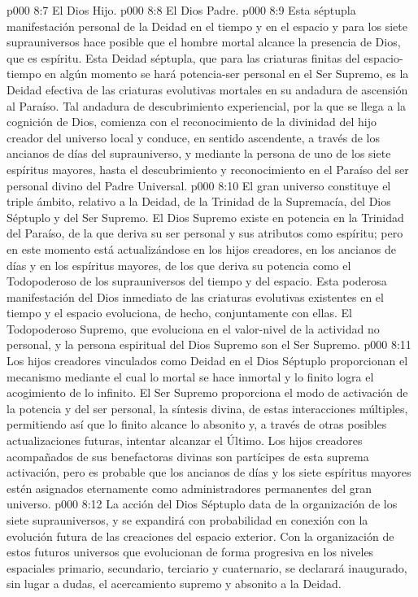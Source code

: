 \vs p000 8:7 El Dios Hijo.
\vs p000 8:8 El Dios Padre.
\vs p000 8:9 \pc Esta séptupla manifestación personal de la Deidad en el tiempo y en el espacio y para los siete suprauniversos hace posible que el hombre mortal alcance la presencia de Dios, que es espíritu. Esta Deidad séptupla, que para las criaturas finitas del espacio\hyp{}tiempo en algún momento se hará potencia\hyp{}ser personal en el Ser Supremo, es la Deidad efectiva de las criaturas evolutivas mortales en su andadura de ascensión al Paraíso. Tal andadura de descubrimiento experiencial, por la que se llega a la cognición de Dios, comienza con el reconocimiento de la divinidad del hijo creador del universo local y conduce, en sentido ascendente, a través de los ancianos de días del suprauniverso, y mediante la persona de uno de los siete espíritus mayores, hasta el descubrimiento y reconocimiento en el Paraíso del ser personal divino del Padre Universal.
\vs p000 8:10 \pc El gran universo constituye el triple ámbito, relativo a la Deidad, de la Trinidad de la Supremacía, del Dios Séptuplo y del Ser Supremo. El Dios Supremo existe en potencia en la Trinidad del Paraíso, de la que deriva su ser personal y sus atributos como espíritu; pero en este momento está actualizándose en los hijos creadores, en los ancianos de días y en los espíritus mayores, de los que deriva su potencia como el Todopoderoso de los suprauniversos del tiempo y del espacio. Esta poderosa manifestación del Dios inmediato de las criaturas evolutivas existentes en el tiempo y el espacio evoluciona, de hecho, conjuntamente con ellas. El Todopoderoso Supremo, que evoluciona en el valor\hyp{}nivel de la actividad no personal, y la persona espiritual del Dios Supremo son  el Ser Supremo.
\vs p000 8:11 Los hijos creadores vinculados como Deidad en el Dios Séptuplo proporcionan el mecanismo mediante el cual lo mortal se hace inmortal y lo finito logra el acogimiento de lo infinito. El Ser Supremo proporciona el modo de activación de la potencia y del ser personal, la síntesis divina, de  estas interacciones múltiples, permitiendo así que lo finito alcance lo absonito y, a través de otras posibles actualizaciones futuras, intentar alcanzar el Último. Los hijos creadores acompañados de sus benefactoras divinas son partícipes de esta suprema activación, pero es probable que los ancianos de días y los siete espíritus mayores estén asignados eternamente como administradores permanentes del gran universo.
\vs p000 8:12 La acción del Dios Séptuplo data de la organización de los siete suprauniversos, y se expandirá con probabilidad en conexión con la evolución futura de las creaciones del espacio exterior. Con la organización de estos futuros universos que evolucionan de forma progresiva en los niveles espaciales primario, secundario, terciario y cuaternario, se declarará inaugurado, sin lugar a dudas, el acercamiento supremo y absonito a la Deidad.
